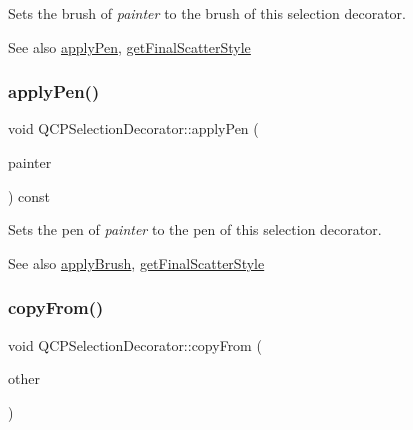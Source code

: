 Sets the brush of {\itshape painter} to the brush of this selection decorator.

\begin{DoxySeeAlso}{See also}
\hyperlink{classQCPSelectionDecorator_a75098893f7d08660ea449206810679d7}{apply\+Pen}, \hyperlink{classQCPSelectionDecorator_a1277b373248896bc70e8cc1de96da9fa}{get\+Final\+Scatter\+Style} 
\end{DoxySeeAlso}
\mbox{\label{classQCPSelectionDecorator_a75098893f7d08660ea449206810679d7}} 
\subsubsection{\texorpdfstring{apply\+Pen()}{applyPen()}}
{\footnotesize\ttfamily void Q\+C\+P\+Selection\+Decorator\+::apply\+Pen (\begin{DoxyParamCaption}\item[{\hyperlink{classQCPPainter}{Q\+C\+P\+Painter} $\ast$}]{painter }\end{DoxyParamCaption}) const}

Sets the pen of {\itshape painter} to the pen of this selection decorator.

\begin{DoxySeeAlso}{See also}
\hyperlink{classQCPSelectionDecorator_a225544527d51b49546b70d0e6d655a34}{apply\+Brush}, \hyperlink{classQCPSelectionDecorator_a1277b373248896bc70e8cc1de96da9fa}{get\+Final\+Scatter\+Style} 
\end{DoxySeeAlso}
\mbox{\label{classQCPSelectionDecorator_a467a8d5cfcab27e862a17c797ac27b8a}} 
\subsubsection{\texorpdfstring{copy\+From()}{copyFrom()}}
{\footnotesize\ttfamily void Q\+C\+P\+Selection\+Decorator\+::copy\+From (\begin{DoxyParamCaption}\item[{const \hyperlink{classQCPSelectionDecorator}{Q\+C\+P\+Selection\+Decorator} $\ast$}]{other }\end{DoxyParamCaption})\hspace{0.3cm}{\ttfamily [virtual]}}

